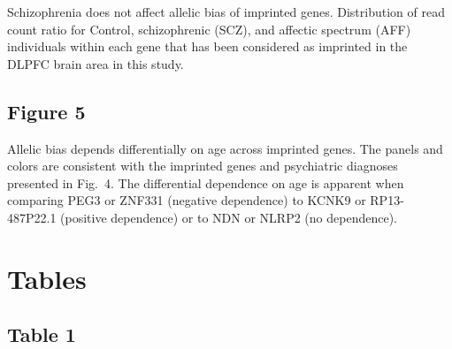 \documentclass[letterpaper]{article}
\begin{document}
Schizophrenia does not affect allelic bias of imprinted genes.
Distribution of read count ratio for Control, schizophrenic (SCZ), and
affectic spectrum (AFF) individuals within each gene that has been considered as imprinted in the DLPFC
brain area in this study.

\subsection*{Figure 5}

Allelic bias depends differentially on age across imprinted genes.
The panels and colors are consistent with the imprinted genes and psychiatric diagnoses
presented in Fig.~4.  The differential dependence on age is apparent
when comparing PEG3 or ZNF331 (negative dependence) to KCNK9 or RP13-487P22.1
(positive dependence) or to NDN or NLRP2 (no dependence).

\section*{Tables}

\subsection*{Table 1}
\end{document}
